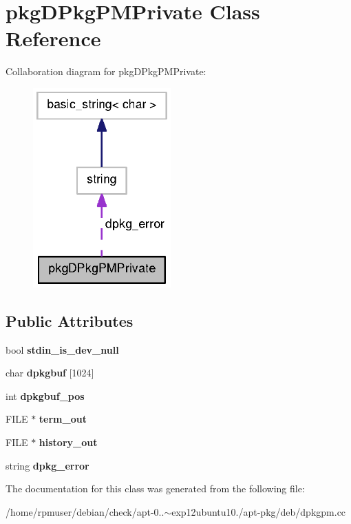 \section{pkg\-D\-Pkg\-P\-M\-Private \-Class \-Reference}
\label{classpkgDPkgPMPrivate}


\-Collaboration diagram for pkg\-D\-Pkg\-P\-M\-Private\-:
\nopagebreak
\begin{figure}[H]
\begin{center}
\leavevmode
\includegraphics[width=150pt]{classpkgDPkgPMPrivate__coll__graph}
\end{center}
\end{figure}
\subsection*{\-Public \-Attributes}
\begin{DoxyCompactItemize}
\item 
bool {\bfseries stdin\-\_\-is\-\_\-dev\-\_\-null}\label{classpkgDPkgPMPrivate_a2a6abacbcc64cb0bc3477c8c3c4430ed}

\item 
char {\bfseries dpkgbuf} [1024]\label{classpkgDPkgPMPrivate_acb9fce9c4f2c3cd01c183ff339c81901}

\item 
int {\bfseries dpkgbuf\-\_\-pos}\label{classpkgDPkgPMPrivate_a115a9d2dfd41b2c7ee07b6ec0aa50f5e}

\item 
\-F\-I\-L\-E $\ast$ {\bfseries term\-\_\-out}\label{classpkgDPkgPMPrivate_a54a2ffd5b47ae1ca9d3d7644e14d1506}

\item 
\-F\-I\-L\-E $\ast$ {\bfseries history\-\_\-out}\label{classpkgDPkgPMPrivate_a9cf015611ac67c16a001414623ce5ff1}

\item 
string {\bfseries dpkg\-\_\-error}\label{classpkgDPkgPMPrivate_a2ffcf6d264f643ff4160c2092c0b8096}

\end{DoxyCompactItemize}


\-The documentation for this class was generated from the following file\-:\begin{DoxyCompactItemize}
\item 
/home/rpmuser/debian/check/apt-\/0..$\sim$exp12ubuntu10./apt-\/pkg/deb/dpkgpm.\-cc\end{DoxyCompactItemize}
